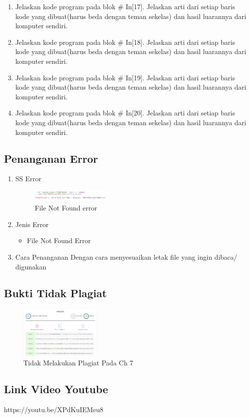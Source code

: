 \begin{enumerate}
\item Jelaskan kode program pada blok \# In[17]. Jelaskan arti dari setiap baris kode yang dibuat(harus beda dengan teman sekelas) dan hasil luarannya dari komputer sendiri.


\item Jelaskan kode program pada blok \# In[18]. Jelaskan arti dari setiap baris kode yang dibuat(harus beda dengan teman sekelas) dan hasil luarannya dari komputer sendiri.


\item Jelaskan kode program pada blok \# In[19]. Jelaskan arti dari setiap baris kode yang dibuat(harus beda dengan teman sekelas) dan hasil luarannya dari komputer sendiri.


\item Jelaskan kode program pada blok \# In[20]. Jelaskan arti dari setiap baris kode yang dibuat(harus beda dengan teman sekelas) dan hasil luarannya dari komputer sendiri.

\end{enumerate}
\subsection{Penanganan Error}
\begin{enumerate}
	\item SS Error
	\begin{figure}[H]
		\includegraphics[width=4cm]{figures/1174087/7/error.png}
		\centering
		\caption{File Not Found error}
	\end{figure}
	\item Jenis Error
	\begin{itemize}
		\item File Not Found Error
	\end{itemize}
	\item Cara Penanganan
	\hfill\break
	Dengan cara menyesuaikan letak file yang ingin dibaca/ digunakan
\end{enumerate}
\subsection{Bukti Tidak Plagiat}
\begin{figure}[H]
    \includegraphics[width=4cm]{figures/1174087/7/plagiat.png}
    \centering
    \caption{Tidak Melakukan Plagiat Pada Ch 7}
\end{figure}

\subsection{Link Video Youtube}
https://youtu.be/XPdKuIEMeu8